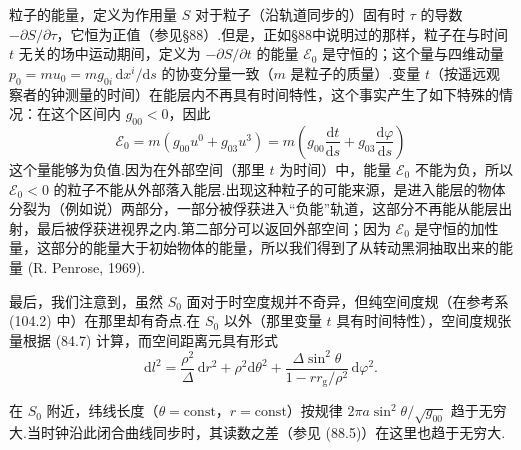粒子的能量，定义为作用量 $S$ 对于粒子（沿轨道同步的）固有时 $\tau$ 的导数 $-\partial S/\partial\tau$，它恒为正值（参见§88）.但是，正如§88中说明过的那样，粒子在与时间 $t$ 无关的场中运动期间，定义为 $-\partial S/\partial t$ 的能量 $\mathcal{E}_0$ 是守恒的；这个量与四维动量 $p_0=mu_0=mg_{0i}\,\mathrm{d}x^i/\mathrm{d}s$ 的协变分量一致（$m$ 是粒子的质量）.变量 $t$（按遥远观察者的钟测量的时间）在能层内不再具有时间特性，这个事实产生了如下特殊的情况：在这个区间内 $g_{00}<0$，因此
\begin{equation*}
  \mathcal{E}_0=m(g_{00}u^{0}+g_{03}u^{3})
  =m\left(g_{00}\frac{\mathrm{d}t}{\mathrm{d}s}
  +g_{03}\frac{\mathrm{d}\varphi}{\mathrm{d}s}\right)
\end{equation*}
这个量能够为负值.因为在外部空间（那里 $t$ 为时间）中，能量 $\mathcal{E}_0$ 不能为负，所以 $\mathcal{E}_0<0$ 的粒子不能从外部落入能层.出现这种粒子的可能来源，是进入能层的物体分裂为（例如说）两部分，一部分被俘获进入“负能”轨道，这部分不再能从能层出射，最后被俘获进视界之内.第二部分可以返回外部空间；因为 $\mathcal{E}_0$ 是守恒的加性量，这部分的能量大于初始物体的能量，所以我们得到了从转动黑洞抽取出来的能量 (R. Penrose, 1969).

最后，我们注意到，虽然 $S_0$ 面对于时空度规并不奇异，但纯空间度规（在参考系 (104.2) 中）在那里却有奇点.在 $S_0$ 以外（那里变量 $t$ 具有时间特性），空间度规张量根据 (84.7) 计算，而空间距离元具有形式
\begin{equation}
  \mathrm{d}l^{2}=\frac{\rho^{2}}{\varDelta}\,\mathrm{d}r^{2}
  +\rho^{2}\mathrm{d}\theta^{2}
  +\frac{\varDelta\sin^{2}\theta}{1-rr_{\mathrm{g}}/\rho^{2}}\,\mathrm{d}\varphi^{2}.
\end{equation}

在 $S_0$ 附近，纬线长度（$\theta=\mathrm{const}$，$r=\mathrm{const}$）按规律 $2\pi a\sin^{2}\theta/\sqrt{g_{00}}$ 趋于无穷大.当时钟沿此闭合曲线同步时，其读数之差（参见 (88.5)）在这里也趋于无穷大.

